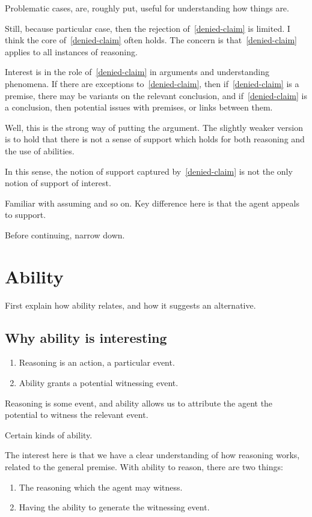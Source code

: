 \documentclass[10pt]{article}
\begin{document}
Problematic cases, are, roughly put, useful for understanding how things are.

Still, because particular case, then the rejection of~\ref{denied-claim} is limited.
I think the core of~\ref{denied-claim} often holds.
The concern is that~\ref{denied-claim} applies to all instances of reasoning.

Interest is in the role of~\ref{denied-claim} in arguments and understanding phenomena.
If there are exceptions to~\ref{denied-claim}, then if~\ref{denied-claim} is a premise, there may be variants on the relevant conclusion, and if~\ref{denied-claim} is a conclusion, then potential issues with premises, or links between them.




Well, this is the strong way of putting the argument.
The slightly weaker version is to hold that there is not a sense of support which holds for both reasoning and the use of abilities.

In this sense, the notion of support captured by~\ref{denied-claim} is not the only notion of support of interest.

Familiar with assuming and so on.
Key difference here is that the agent appeals to support.

Before continuing, narrow down.



\section{Ability}
\label{sec:ability}

First explain how ability relates, and how it suggests an alternative.

\subsection{Why ability is interesting}
\label{sec:why-abil-inter}

\begin{enumerate}
\item Reasoning is an action, a particular event.
\item Ability grants a potential witnessing event.
\end{enumerate}

Reasoning is some event, and ability allows us to attribute the agent the potential to witness the relevant event.

Certain kinds of ability.

The interest here is that we have a clear understanding of how reasoning works, related to the general premise.
With ability to reason, there are two things:
\begin{enumerate}
\item The reasoning which the agent may witness.
\item Having the ability to generate the witnessing event.
\end{enumerate}
\end{document}
